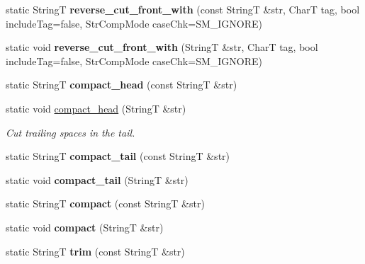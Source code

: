 \begin{CompactItemize}
\item 
\hypertarget{classAlgorithm_410bae390e6e6bcf16578718e2ac5aae}{
static StringT \textbf{reverse\_\-cut\_\-front\_\-with} (const StringT \&str, CharT tag, bool includeTag=false, StrCompMode caseChk=SM\_\-IGNORE)}
\label{classAlgorithm_410bae390e6e6bcf16578718e2ac5aae}

\item 
\hypertarget{classAlgorithm_6fb647cfad98ebf7d9ea6fb15c1a99ae}{
static void \textbf{reverse\_\-cut\_\-front\_\-with} (StringT \&str, CharT tag, bool includeTag=false, StrCompMode caseChk=SM\_\-IGNORE)}
\label{classAlgorithm_6fb647cfad98ebf7d9ea6fb15c1a99ae}

\item 
\hypertarget{classAlgorithm_408ada0c548f1efe5437092a030ad3a8}{
static StringT \textbf{compact\_\-head} (const StringT \&str)}
\label{classAlgorithm_408ada0c548f1efe5437092a030ad3a8}

\item 
\hypertarget{classAlgorithm_cecd9de0fd80290980dd73ab23517844}{
static void \hyperlink{classAlgorithm_cecd9de0fd80290980dd73ab23517844}{compact\_\-head} (StringT \&str)}
\label{classAlgorithm_cecd9de0fd80290980dd73ab23517844}

\begin{CompactList}\small\item\em Cut trailing spaces in the tail. \item\end{CompactList}\item 
\hypertarget{classAlgorithm_5e6276cd46260bf390528f3912f45219}{
static StringT \textbf{compact\_\-tail} (const StringT \&str)}
\label{classAlgorithm_5e6276cd46260bf390528f3912f45219}

\item 
\hypertarget{classAlgorithm_e53ee74a9acd0c38f05e9165b0793b12}{
static void \textbf{compact\_\-tail} (StringT \&str)}
\label{classAlgorithm_e53ee74a9acd0c38f05e9165b0793b12}

\item 
\hypertarget{classAlgorithm_25e7102a43f8619c1bb4267fc73b2336}{
static StringT \textbf{compact} (const StringT \&str)}
\label{classAlgorithm_25e7102a43f8619c1bb4267fc73b2336}

\item 
\hypertarget{classAlgorithm_e270ae897f5dda1b8e2d007913f777bd}{
static void \textbf{compact} (StringT \&str)}
\label{classAlgorithm_e270ae897f5dda1b8e2d007913f777bd}

\item 
\hypertarget{classAlgorithm_de1ad223dfbe083fef46669426ccf599}{
static StringT \textbf{trim} (const StringT \&str)}
\label{classAlgorithm_de1ad223dfbe083fef46669426ccf599}


\end{CompactItemize}
